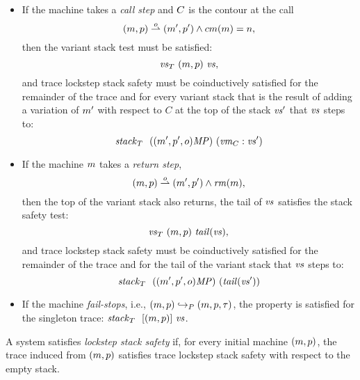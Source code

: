 \documentclass[acmsmall,review,anonymous]{acmart}\settopmatter{printfolios=true,printccs=false,printacmref=false}
\begin{document}
{\begin{itemize}
\item
  If the machine takes a \emph{call step} and $C$ is the contour at
  the call
  \[(m, p) \overset{o}{\rightharpoonup} (m', p') \wedge cm(m) = n,\]
%
  then the variant stack test must be
  satisfied:
  \[\mathit{\mathit{vs}}_T ~ (m, p) ~ \mathit{vs},\]
%
%
  and trace lockstep stack safety must be coinductively satisfied
  for the remainder of the trace and for every variant stack
  that is the result of adding a variation of $m'$ with
  respect to $C$ at the top of the stack $\mathit{vs}'$ that $\mathit{vs}$ steps
  to:
  \[\mathit{stack}_T ~  ~ ((m', p', o)\mathit{MP}) ~ (\mathit{vm}_{C} : \mathit{vs}')\]

\item
%
  If the machine $m$ takes a \emph{return step},
  \[(m, p) \overset{o}{\rightharpoonup} (m', p') \wedge \mathit{rm}(m),\]
  then the top of the variant stack also returns,
  the tail of $\mathit{vs}$ satisfies the stack safety test:
  \[\mathit{\mathit{vs}}_T ~ (m, p) ~ \mathit{tail}(\mathit{vs}),\]
  and trace lockstep stack safety must be coinductively satisfied for
  the remainder of the trace and for the tail of the variant stack
  that $\mathit{vs}$ steps to:
  \[\mathit{stack}_T ~  ~ ((m', p', o)\mathit{MP}) ~ (\mathit{tail}(\mathit{vs}'))\]

\item If the machine \emph{fail-stops}, i.e., $(m, p) \hookrightarrow_P
    (m, p, \tau)$, the property is satisfied for the singleton trace:
    $\mathit{stack}_T ~  ~ [(m, p)] ~ \mathit{vs}$.


  \end{itemize}

%
A system satisfies {\em lockstep stack safety} if, for every initial machine $(m,p)$,
the trace induced from $(m, p)$ satisfies trace lockstep stack safety with
respect to the empty stack.

}
\end{document}
